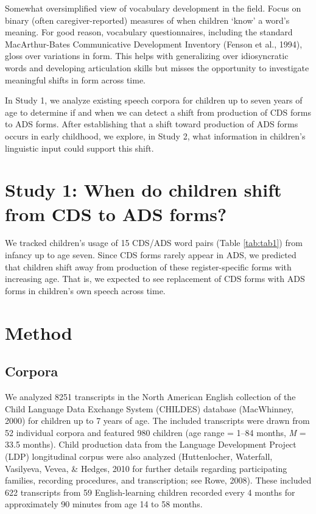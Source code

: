 \documentclass[10pt, letterpaper]{article}
\begin{document}
Somewhat oversimplified view of vocabulary development in the field.
Focus on binary (often caregiver-reported) measures of when children
`know' a word's meaning. For good reason, vocabulary questionnaires,
including the standard MacArthur-Bates Communicative Development
Inventory (Fenson et al., 1994), gloss over variations in form. This
helps with generalizing over idiosyncratic words and developing
articulation skills but misses the opportunity to investigate meaningful
shifts in form across time.

In Study 1, we analyze existing speech corpora for children up to seven
years of age to determine if and when we can detect a shift from
production of CDS forms to ADS forms. After establishing that a shift
toward production of ADS forms occurs in early childhood, we explore, in
Study 2, what information in children's linguistic input could support
this shift.

\hypertarget{study-1-when-do-children-shift-from-cds-to-ads-forms}{%
\section{Study 1: When do children shift from CDS to ADS
forms?}\label{study-1-when-do-children-shift-from-cds-to-ads-forms}}

We tracked children's usage of 15 CDS/ADS word pairs (Table
\ref{tab:tab1}) from infancy up to age seven. Since CDS forms rarely
appear in ADS, we predicted that children shift away from production of
these register-specific forms with increasing age. That is, we expected
to see replacement of CDS forms with ADS forms in children's own speech
across time.

\hypertarget{method}{%
\section{Method}\label{method}}

\hypertarget{corpora}{%
\subsection{Corpora}\label{corpora}}

We analyzed 8251 transcripts in the North American English collection of
the Child Language Data Exchange System (CHILDES) database (MacWhinney,
2000) for children up to 7 years of age. The included transcripts were
drawn from 52 individual corpora and featured 980 children (age range =
1--84 months, \emph{M} = 33.5 months). Child production data from the
Language Development Project (LDP) longitudinal corpus were also
analyzed (Huttenlocher, Waterfall, Vasilyeva, Vevea, \& Hedges, 2010 for
further details regarding participating families, recording procedures,
and transcription; see Rowe, 2008). These included 622 transcripts from
59 English-learning children recorded every 4 months for approximately
90 minutes from age 14 to 58 months.
\end{document}
